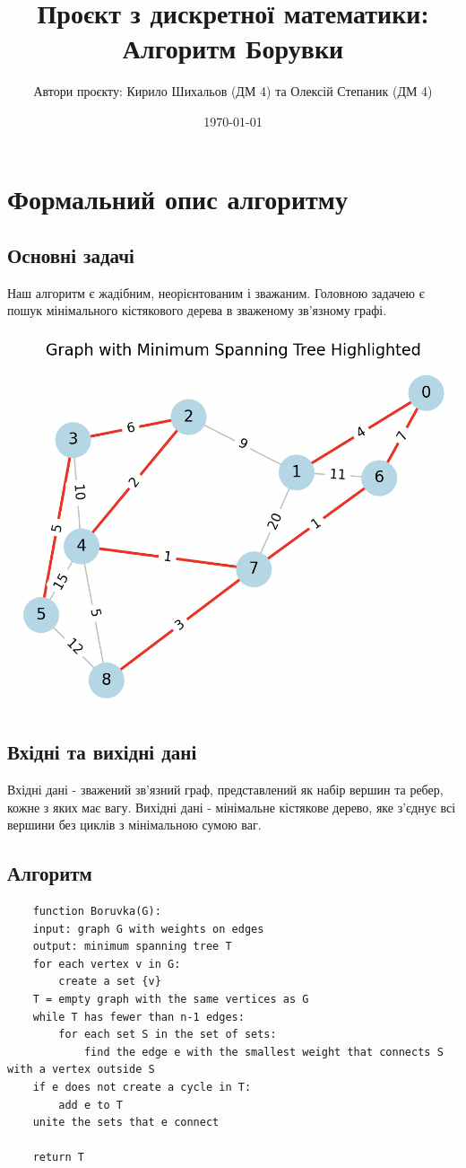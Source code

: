 \documentclass[12pt, letterpaper, twoside]{article}
\title{Проєкт з дискретної математики: 
	Алгоритм Борувки}
\author{Автори проєкту: Кирило Шихальов (ДМ 4) та Олексій Степаник (ДМ 4)}
\date{\today}
\begin{document}
\maketitle
\section{Формальний опис алгоритму}
\subsection{Основні задачі}
Наш алгоритм є жадібним, неорієнтованим і зважаним. Головною задачею є пошук мінімального кістякового дерева в зваженому зв'язному графі.

\includegraphics{graph.png}
\subsection{Вхідні та вихідні дані}
Вхідні дані - зважений зв'язний граф, представлений як набір вершин та ребер, кожне з яких має вагу. Вихідні дані - мінімальне кістякове дерево, яке з'єднує всі вершини без циклів з мінімальною сумою ваг.

\subsection{Алгоритм}
\begin{verbatim}	
	function Boruvka(G):
	input: graph G with weights on edges
	output: minimum spanning tree T
	for each vertex v in G:
		create a set {v}
	T = empty graph with the same vertices as G
	while T has fewer than n-1 edges:
		for each set S in the set of sets:
			find the edge e with the smallest weight that connects S with a vertex outside S
	if e does not create a cycle in T:
		add e to T
	unite the sets that e connect
	
	return T
\end{verbatim}
\end{document}

